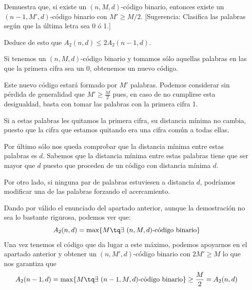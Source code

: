 \begin{problem}[6]
\ppart Demuestra que, si existe un $(n,M,d)$-código binario, entonces
existe un $(n-1,M',d)$-código binario con  $M'\ge M/2$.
[Sugerencia: Clasifica las palabras según que la última letra sea
0 ó 1.]

\ppart Deduce de esto que $A_2(n,d)\le 2 A_2(n-1,d)$.
\solution


\spart

Si tenemos un $(n,M,d)$-código binario y tomamos sólo aquellas palabras en las que la primera cifra sea un 0, obtenemos un nuevo código.

Este nuevo código estará formado por $M'$ palabras. Podemos considerar sin pérdida de generalidad que $M'\geq \frac{M}{2}$ pues, en caso de no cumplirse esta desigualdad, basta con tomar las palabras con la primera cifra 1.

Si a estas palabras les quitamos la primera cifra, su distancia mínima no cambia, puesto que la cifra que estamos quitando era una cifra común a todas ellas.

Por último sólo nos queda comprobar que la distancia mínima entre estas palabras es $d$. Sabemos que la distancia mínima entre estas palabras tiene que ser mayor que $d$ puesto que proceden de un código con distancia mínima $d$.

Por otro lado, si ninguna par de palabras estuviesen a distancia $d$, podríamos modificar una de las palabras forzando el acercamiento.

\spart

Dando por válido el enunciado del apartado anterior, aunque la demostración no sea lo bastante rigurosa, podemos ver que:
\[A_2(n,d) = \max\{M \tq \exists \ (n,M,d)\text{-código binario}\}\]
Una vez tenemos el código que da lugar a este máximo, podemos apoyarnos en el apartado anterior y obtener un $(n,M',d)$-código binario con $2M'\geq M$ lo que nos garantiza que
\[A_2(n-1,d) = \max\{M \tq \exists \ (n-1,M,d)\text{-código binario}\} \geq \frac{M}{2} = A_2(n,d)\]
\end{problem}


